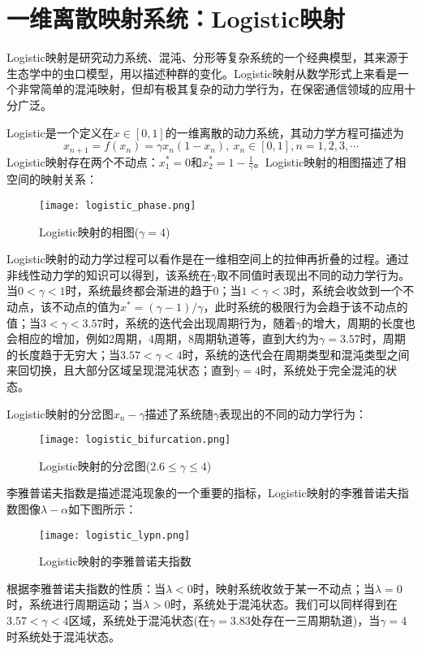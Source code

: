 \section{一维离散映射系统：Logistic映射}
Logistic映射是研究动力系统、混沌、分形等复杂系统的一个经典模型，其来源于生态学中的虫口模型，用以描述种群的变化。Logistic映射从数学形式上来看是一个非常简单的混沌映射，但却有极其复杂的动力学行为，在保密通信领域的应用十分广泛。

Logistic是一个定义在$x\in [0,1]$的一维离散的动力系统，其动力学方程可描述为
\begin{equation}
    x_{n+1}=f(x_n)=\gamma x_n(1-x_n),\ x_n\in [0,1], n=1,2,3,\cdots
\end{equation}
Logistic映射存在两个不动点：$x_1^*=0$和$x_2^*=1-\frac{1}{\gamma}$。Logistic映射的相图描述了相空间的映射关系：
\begin{figure}
	\centering
	\texttt{[image: logistic\_phase.png]}
    \caption{Logistic映射的相图($\gamma=4$)}
    \label{fig:logi_pha}
\end{figure}

Logistic映射的动力学过程可以看作是在一维相空间上的拉伸再折叠的过程。通过非线性动力学的知识可以得到，该系统在$\gamma$取不同值时表现出不同的动力学行为。当$0<\gamma<1$时，系统最终都会渐进的趋于0；当$1<\gamma<3$时，系统会收敛到一个不动点，该不动点的值为$x^*=(\gamma-1)/\gamma$，此时系统的极限行为会趋于该不动点的值；当$3<\gamma<3.57$时，系统的迭代会出现周期行为，随着$\gamma$的增大，周期的长度也会相应的增加，例如2周期，4周期，8周期轨道等，直到大约为$\gamma=3.57$时，周期的长度趋于无穷大；当$3.57<\gamma<4$时，系统的迭代会在周期类型和混沌类型之间来回切换，且大部分区域呈现混沌状态；直到$\gamma=4$时，系统处于完全混沌的状态。

Logistic映射的分岔图$x_n-\gamma$描述了系统随$\gamma$表现出的不同的动力学行为：
\begin{figure}
	\centering
	\texttt{[image: logistic\_bifurcation.png]}
    \caption{Logistic映射的分岔图($2.6\leqslant\gamma\leqslant 4$)}
    \label{fig:logi_pha}
\end{figure}

李雅普诺夫指数是描述混沌现象的一个重要的指标，Logistic映射的李雅普诺夫指数图像$\lambda-\alpha$如下图所示：
\begin{figure}
	\centering
	\texttt{[image: logistic\_lypn.png]}
    \caption{Logistic映射的李雅普诺夫指数}
    \label{fig:logi_lypn}
\end{figure}
根据李雅普诺夫指数的性质：当$\lambda<0$时，映射系统收敛于某一不动点；当$\lambda=0$时，系统进行周期运动；当$\lambda>0$时，系统处于混沌状态。我们可以同样得到在$3.57<\gamma<4$区域，系统处于混沌状态(在$\gamma=3.83$处存在一三周期轨道)，当$\gamma=4$时系统处于混沌状态。

